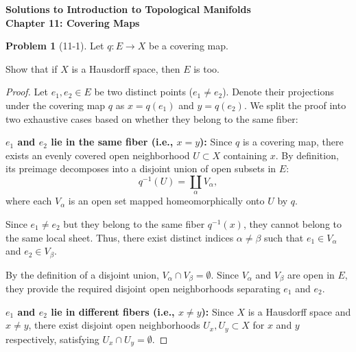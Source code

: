 \documentclass[11pt, a4paper]{article}
\theoremstyle{definition}
\newtheorem{prob}{Problem}
\newenvironment{problem}[1][]{\begin{prob}[#1]\normalfont}{\end{prob}\vspace{1.5em}}
\begin{document}
\begin{center}
    {\LARGE \bf \sffamily Solutions to Introduction to Topological Manifolds} \\
    \vspace{0.4em}
    {\Large \bf \sffamily Chapter 11: Covering Maps} \\
    \vspace{1.5em}
\end{center}

\begin{problem}[11-1]
Let $q: E \to X$ be a covering map. 
\begin{enumerate}[(a)]
    \item Show that if $X$ is a Hausdorff space, then $E$ is too.
    
    \begin{proof}
    Let $e_1, e_2 \in E$ be two distinct points ($e_1 \neq e_2$). Denote their projections under the covering map $q$ as $x = q(e_1)$ and $y = q(e_2)$. We split the proof into two exhaustive cases based on whether they belong to the same fiber:

        \item[$1^\circ$] \textbf{$e_1$ and $e_2$ lie in the same fiber (i.e., $x = y$):} 
        Since $q$ is a covering map, there exists an evenly covered open neighborhood $U \subset X$ containing $x$. By definition, its preimage decomposes into a disjoint union of open subsets in $E$:
        \[
        q^{-1}(U) = \coprod_{\alpha} V_{\alpha},
        \]
        where each $V_{\alpha}$ is an open set mapped homeomorphically onto $U$ by $q$. 

        Since $e_1 \neq e_2$ but they belong to the same fiber $q^{-1}(x)$, they cannot belong to the same local sheet. Thus, there exist distinct indices $\alpha \neq \beta$ such that $e_1 \in V_{\alpha}$ and $e_2 \in V_{\beta}$. 

        By the definition of a disjoint union, $V_{\alpha} \cap V_{\beta} = \emptyset$. Since $V_{\alpha}$ and $V_{\beta}$ are open in $E$, they provide the required disjoint open neighborhoods separating $e_1$ and $e_2$.

        \item[$2^\circ$] \textbf{$e_1$ and $e_2$ lie in different fibers (i.e., $x \neq y$):}
        Since $X$ is a Hausdorff space and $x \neq y$, there exist disjoint open neighborhoods $U_x, U_y \subset X$ for $x$ and $y$ respectively, satisfying $U_x \cap U_y = \emptyset$.


\end{proof}
\end{enumerate}
\end{problem}
\end{document}
